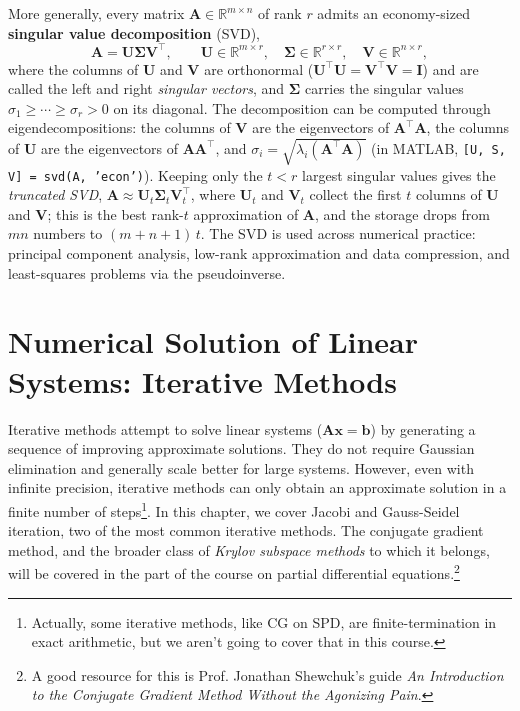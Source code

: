 More generally, every matrix $\mathbf{A} \in \mathbb{R}^{m \times n}$ of rank $r$ admits an economy-sized \textbf{singular value decomposition} (SVD),
\begin{equation*}
    \mathbf{A} = \mathbf{U} \boldsymbol{\Sigma} \mathbf{V}^\top,
    \qquad \mathbf{U} \in \mathbb{R}^{m \times r}, \quad \boldsymbol{\Sigma} \in \mathbb{R}^{r \times r}, \quad \mathbf{V} \in \mathbb{R}^{n \times r},
\end{equation*}
where the columns of $\mathbf{U}$ and $\mathbf{V}$ are orthonormal ($\mathbf{U}^\top\mathbf{U} = \mathbf{V}^\top\mathbf{V} = \mathbf{I}$) and are called the left and right \emph{singular vectors}, and $\boldsymbol{\Sigma}$ carries the singular values $\sigma_1 \geq \cdots \geq \sigma_r > 0$ on its diagonal.
The decomposition can be computed through eigendecompositions: the columns of $\mathbf{V}$ are the eigenvectors of $\mathbf{A}^\top\mathbf{A}$, the columns of $\mathbf{U}$ are the eigenvectors of $\mathbf{A}\mathbf{A}^\top$, and $\sigma_i = \sqrt{\lambda_i(\mathbf{A}^\top\mathbf{A})}$ (in MATLAB, \texttt{[U, S, V] = svd(A, 'econ')}).
Keeping only the $t < r$ largest singular values gives the \emph{truncated SVD}, $\mathbf{A} \approx \mathbf{U}_t \boldsymbol{\Sigma}_t \mathbf{V}_t^\top$, where $\mathbf{U}_t$ and $\mathbf{V}_t$ collect the first $t$ columns of $\mathbf{U}$ and $\mathbf{V}$; this is the best rank-$t$ approximation of $\mathbf{A}$, and the storage drops from $mn$ numbers to $(m + n + 1)\, t$.
The SVD is used across numerical practice: principal component analysis, low-rank approximation and data compression, and least-squares problems via the pseudoinverse.

\section{Numerical Solution of Linear Systems: Iterative Methods}
\label{sec:num_sol_linear_iterative}
Iterative methods attempt to solve linear systems ($\mathbf{A}\mathbf{x} = \mathbf{b}$) by generating a sequence of improving approximate solutions. They do not require Gaussian elimination and generally scale better for large systems. However, even with infinite precision, iterative methods can only obtain an approximate solution in a finite number of steps\footnote{Actually, some iterative methods, like CG on SPD, are finite-termination in exact arithmetic, but we aren't going to cover that in this course.}. In this chapter, we cover Jacobi and Gauss-Seidel iteration, two of the most common iterative methods. The conjugate gradient method, and the broader class of \emph{Krylov subspace methods} to which it belongs, will be covered in the part of the course on partial differential equations.\footnote{A good resource for this is Prof. Jonathan Shewchuk's guide \textit{An Introduction to the Conjugate Gradient Method Without the Agonizing Pain}.\autocite{shewchuk1994}}

